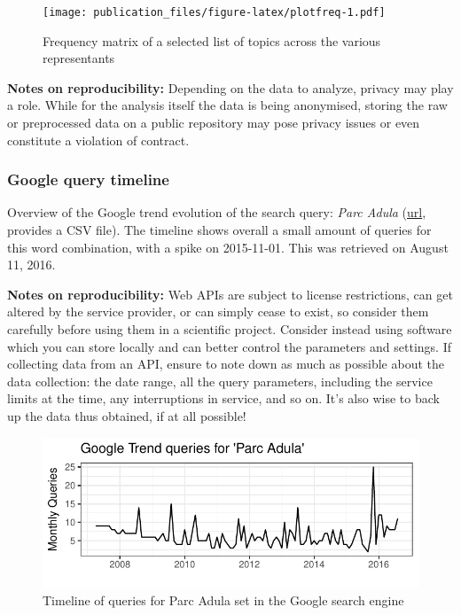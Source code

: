\documentclass[]{article}
\begin{document}
\begin{figure}
\centering
\texttt{[image: publication\_files/figure-latex/plotfreq-1.pdf]}
\caption{Frequency matrix of a selected list of topics across the
various representants}
\end{figure}

\textbf{Notes on reproducibility:} Depending on the data to analyze,
privacy may play a role. While for the analysis itself the data is being
anonymised, storing the raw or preprocessed data on a public repository
may pose privacy issues or even constitute a violation of contract.

\subsubsection{Google query timeline}\label{google-query-timeline}

Overview of the Google trend evolution of the search query: \emph{Parc
Adula}
(\href{https://www.google.com/trends/explore?date=all\&q=parc\%20adula}{url},
provides a CSV file). The timeline shows overall a small amount of
queries for this word combination, with a spike on 2015-11-01. This was
retrieved on August 11, 2016.

\textbf{Notes on reproducibility:} Web APIs are subject to license
restrictions, can get altered by the service provider, or can simply
cease to exist, so consider them carefully before using them in a
scientific project. Consider instead using software which you can store
locally and can better control the parameters and settings. If
collecting data from an API, ensure to note down as much as possible
about the data collection: the date range, all the query parameters,
including the service limits at the time, any interruptions in service,
and so on. It's also wise to back up the data thus obtained, if at all
possible!

\begin{figure}
\centering
\includegraphics{publication_files/figure-latex/googleTrend-1.pdf}
\caption{Timeline of queries for Parc Adula set in the Google search
engine}
\end{figure}
\end{document}
